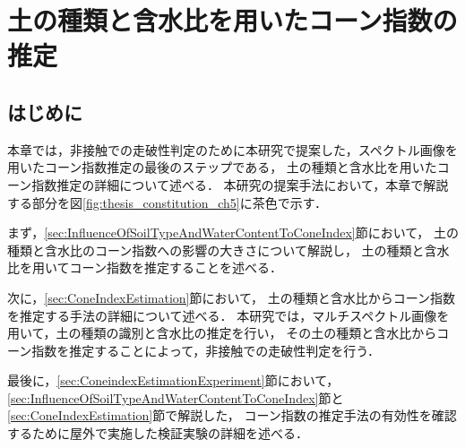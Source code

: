 \chapter{土の種類と含水比を用いたコーン指数の推定}
\thispagestyle{empty}
\label{ch:ConeIndexEstimation}
\minitoc

\newpage
\section{はじめに}
本章では，非接触での走破性判定のために本研究で提案した，スペクトル画像を用いたコーン指数推定の最後のステップである，
土の種類と含水比を用いたコーン指数推定の詳細について述べる．
本研究の提案手法において，本章で解説する部分を図\ref{fig:thesis_constitution_ch5}に茶色で示す．


まず，\ref{sec:InfluenceOfSoilTypeAndWaterContentToConeIndex}節において，
土の種類と含水比のコーン指数への影響の大きさについて解説し，
土の種類と含水比を用いてコーン指数を推定することを述べる．

次に，\ref{sec:ConeIndexEstimation}節において，
土の種類と含水比からコーン指数を推定する手法の詳細について述べる．
本研究では，マルチスペクトル画像を用いて，土の種類の識別と含水比の推定を行い，
その土の種類と含水比からコーン指数を推定することによって，非接触での走破性判定を行う．

最後に，\ref{sec:ConeindexEstimationExperiment}節において，
\ref{sec:InfluenceOfSoilTypeAndWaterContentToConeIndex}節と\ref{sec:ConeIndexEstimation}節で解説した，
コーン指数の推定手法の有効性を確認するために屋外で実施した検証実験の詳細を述べる．


